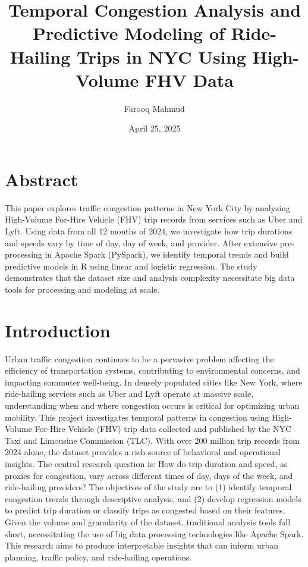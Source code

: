 \documentclass{article}
\title{\vspace{-2cm}Temporal Congestion Analysis and Predictive Modeling of Ride-Hailing Trips in NYC Using High-Volume FHV Data}
\author{Farooq Mahmud}
\date{April 25, 2025}
\begin{document}
\maketitle

\section{Abstract}
This paper explores traffic congestion patterns in New York City by analyzing High-Volume For-Hire Vehicle (FHV) trip records from services such as Uber and Lyft. Using data from all 12 months of 2024, we investigate how trip durations and speeds vary by time of day, day of week, and provider. After extensive pre-processing in Apache Spark (PySpark), we identify temporal trends and build predictive models in R using linear and logistic regression. The study demonstrates that the dataset size and analysis complexity necessitate big data tools for processing and modeling at scale.


\section{Introduction}
Urban traffic congestion continues to be a pervasive problem affecting the efficiency of transportation systems, contributing to environmental concerns, and impacting commuter well-being. In densely populated cities like New York, where ride-hailing services such as Uber and Lyft operate at massive scale, understanding when and where congestion occurs is critical for optimizing urban mobility.
This project investigates temporal patterns in congestion using High-Volume For-Hire Vehicle (FHV) trip data collected and published by the NYC Taxi and Limousine Commission (TLC). With over 200 million trip records from 2024 alone, the dataset provides a rich source of behavioral and operational insights. The central research question is: How do trip duration and speed, as proxies for congestion, vary across different times of day, days of the week, and ride-hailing providers?
The objectives of the study are to (1) identify temporal congestion trends through descriptive analysis, and (2) develop regression models to predict trip duration or classify trips as congested based on their features. Given the volume and granularity of the dataset, traditional analysis tools fall short, necessitating the use of big data processing technologies like Apache Spark. This research aims to produce interpretable insights that can inform urban planning, traffic policy, and ride-hailing operations.
\end{document}
